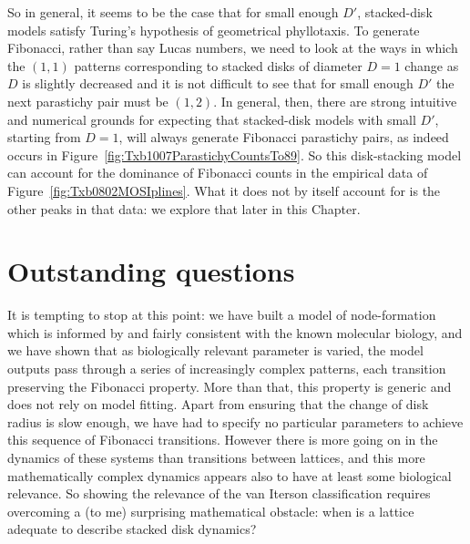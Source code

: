 So in general, it seems to be the case that for small enough $D'$, stacked-disk models satisfy Turing's hypothesis of geometrical phyllotaxis. To generate Fibonacci, rather than say Lucas numbers, we need to look at the ways in which the $(1,1)$ patterns corresponding to stacked disks of diameter $D=1$ change as $D$ is slightly decreased and it is not difficult to see that for small enough $D'$ the next parastichy pair must be $(1,2)$. In general, then, there are strong intuitive and numerical grounds for expecting that stacked-disk models with small $D'$, starting from $D=1$, will always generate Fibonacci parastichy pairs, as indeed occurs in Figure~\ref{fig:Txb1007ParastichyCountsTo89}.
So this disk-stacking model can account for the dominance of Fibonacci counts in the empirical data of Figure~\ref{fig:Txb0802MOSIplines}.  What it does not by itself account for is the other peaks in that data: we explore that later in this Chapter.


\section{Outstanding questions} 


It is tempting to stop at this point: we have built a model of node-formation which is informed by and fairly consistent with the known molecular biology, and we have shown that as biologically relevant parameter is varied, the model outputs pass through a series of increasingly complex patterns, each transition preserving the Fibonacci property. More than that, this property is generic and does not rely on model fitting. Apart from ensuring that the change of disk radius is slow enough, we have had to specify no particular parameters to achieve this sequence of Fibonacci transitions. However there is more going on in the dynamics of these systems than transitions between lattices, and this more mathematically complex dynamics appears also to have at least some biological relevance.  So showing the relevance of the van Iterson classification requires overcoming  a (to me) surprising mathematical obstacle: when is a lattice  adequate to describe stacked disk dynamics?


